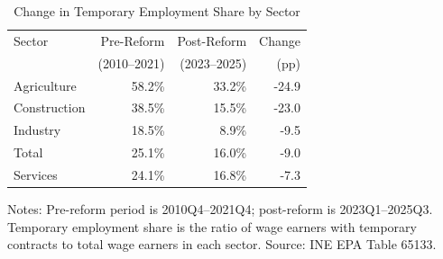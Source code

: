 \begin{table}[H]
\centering
\caption{Change in Temporary Employment Share by Sector}
\begin{threeparttable}
\begin{tabular}{lrrr}
\toprule
Sector & Pre-Reform & Post-Reform & Change \\
 & (2010--2021) & (2023--2025) & (pp) \\
\midrule
Agriculture & 58.2\% & 33.2\% & -24.9 \\
Construction & 38.5\% & 15.5\% & -23.0 \\
Industry & 18.5\% & 8.9\% & -9.5 \\
Total & 25.1\% & 16.0\% & -9.0 \\
Services & 24.1\% & 16.8\% & -7.3 \\
\bottomrule
\end{tabular}
\begin{tablenotes}[flushleft]
\small
\item Notes: Pre-reform period is 2010Q4--2021Q4; post-reform is 2023Q1--2025Q3. Temporary employment share is the ratio of wage earners with temporary contracts to total wage earners in each sector. Source: INE EPA Table 65133.
\end{tablenotes}
\end{threeparttable}
\label{tab:sector}
\end{table}

